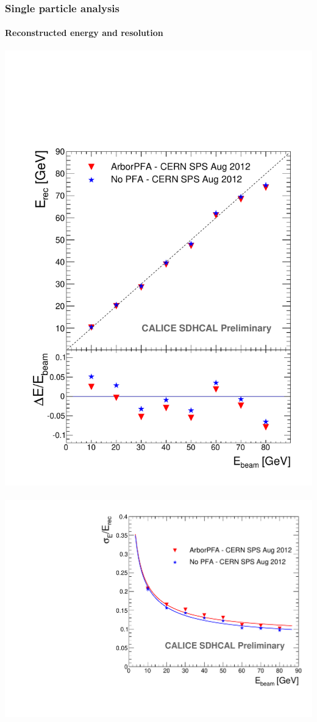 \documentclass[8pt]{beamer}
\begin{document}
  \begin{frame}
  \frametitle{Single particle analysis}
  \framesubtitle{Reconstructed energy and resolution}
    \includegraphics[width=0.45\linewidth]{SingleParticle_ERec.pdf}~
    \includegraphics[width=0.45\linewidth]{SingleParticle_EResol.pdf}
  \end{frame}
  
  
\end{document}
